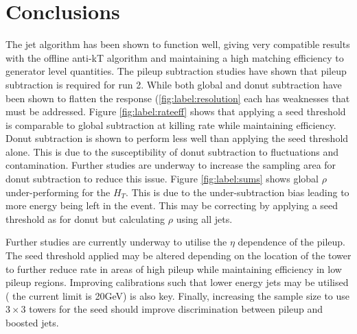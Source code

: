 \section{Conclusions}
The jet algorithm has been shown to function well, giving very compatible results with the offline anti-kT algorithm and maintaining a high matching efficiency to generator level quantities. The pileup subtraction studies have shown that pileup subtraction is required for run 2. While both global and donut subtraction have been shown to flatten the response (\ref{fig:label:resolution} each has weaknesses that must be addressed. Figure \ref{fig:label:rateeff} shows that applying a seed threshold is comparable to global subtraction at killing rate while maintaining efficiency. Donut subtraction is shown to perform less well than applying the seed threshold alone. This is due to the susceptibility of donut subtraction to fluctuations and contamination. Further studies are underway to increase the sampling area for donut subtraction to reduce this issue. Figure \ref{fig:label:sums} shows global $\rho$ under-performing for the $H_T$. This is due to the under-subtraction bias leading to more energy being left in the event. This may be correcting by applying a seed threshold as for donut but calculating $\rho$ using all jets. 

Further studies are currently underway to utilise the $\eta$ dependence of the pileup.  The seed threshold applied may be altered depending on the location of the tower to further reduce rate in areas of high pileup while maintaining efficiency in low pileup regions. Improving calibrations such that lower energy jets may be utilised ( the current limit is 20GeV) is also key. Finally, increasing the sample size to use $3\times3$ towers for the seed should improve discrimination between pileup and boosted jets. 

    
